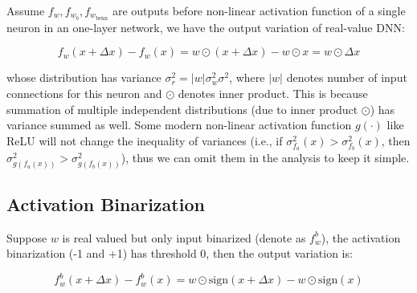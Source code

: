 \documentclass[10pt,twocolumn,letterpaper]{article}
\begin{document}
Assume $f_{w}, f_{w_{b}}, f_{w_{\text{benn}}}$ are outputs before non-linear activation function of a single neuron in an one-layer network, we have the output variation of real-value DNN:

\[
    f_{w}(x+\Delta x) - f_{w}(x) = w \odot (x+\Delta x) - w \odot x = w \odot \Delta x
\]

whose distribution has variance $\sigma_{r}^{2} = |w|\sigma_{w}^{2}\sigma^{2}$, where $|w|$ denotes number of input connections for this neuron and $\odot$ denotes inner product. This is because summation of multiple independent distributions (due to inner product $\odot$) has variance summed as well. Some modern non-linear activation function $g(\cdot)$ like ReLU will not change the inequality of variances (i.e., if $\sigma_{f_{a}}^{2}(x) > \sigma_{f_{b}}^{2}(x)$, then $\sigma_{g(f_{a}(x))}^{2} > \sigma_{g(f_{b}(x))}^{2}$), thus we can omit them in the analysis to keep it simple.

\subsection{Activation Binarization}
\label{sec:acb}
Suppose $w$ is real valued but only input binarized (denote as $f_{w}^{b}$), the activation binarization (-1 and +1) has threshold 0, then the output variation is:

\[
    f_{w}^{b}(x+\Delta x) - f_{w}^{b}(x) = w \odot \text{sign}(x+\Delta x) - w \odot \text{sign}(x)
\]
\end{document}
